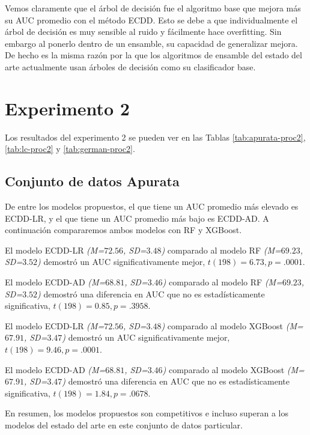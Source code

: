 Vemos claramente que el árbol de decisión fue el algoritmo base que mejora más su \ac{AUC} promedio con el método \ac{ECDD}. Esto se debe a que individualmente el árbol de decisión es muy sensible al ruido y fácilmente hace overfitting. Sin embargo al ponerlo dentro de un ensamble, su capacidad de generalizar mejora. De hecho es la misma razón por la que los algoritmos de ensamble del estado del arte actualmente usan árboles de decisión como su clasificador base.




\section{Experimento 2} %

Los resultados del experimento 2 se pueden ver en las Tablas \ref{tab:apurata-proc2}, \ref{tab:lc-proc2} y \ref{tab:german-proc2}.

\subsection{Conjunto de datos Apurata}

De entre los modelos propuestos, el que tiene un \ac{AUC} promedio más elevado es ECDD-LR, y el que tiene un \ac{AUC} promedio más bajo es ECDD-AD. A continuación compararemos ambos modelos con \ac{RF} y \ac{XGBoost}.

El modelo ECDD-LR \textit{(M=$72.56$, SD=$3.48$)} comparado al modelo \ac{RF} \textit{(M=$69.23$, SD=$3.52$)} demostró un \ac{AUC} significativamente mejor, $t(198)=6.73, p=.0001$.

El modelo ECDD-AD  \textit{(M=$68.81$, SD=$3.46$)} comparado al modelo \ac{RF} \textit{(M=$69.23$, SD=$3.52$)} demostró una diferencia en \ac{AUC} que no es estadísticamente significativa, $t(198)=0.85, p=.3958$.

El modelo ECDD-LR \textit{(M=$72.56$, SD=$3.48$)} comparado al modelo \ac{XGBoost} \textit{(M=$67.91$, SD=$3.47$)} demostró un \ac{AUC} significativamente mejor, $t(198)=9.46, p=.0001$.

El modelo ECDD-AD \textit{(M=$68.81$, SD=$3.46$)} comparado al modelo \ac{XGBoost} \textit{(M=$67.91$, SD=$3.47$)} demostró una diferencia en \ac{AUC} que no es estadísticamente significativa, $t(198)=1.84, p=.0678$.

En resumen, los modelos propuestos son competitivos e incluso superan a los modelos del estado del arte en este conjunto de datos particular.

